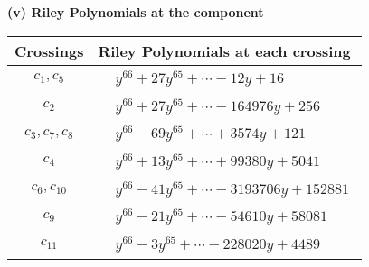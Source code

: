 \documentclass[1p]{elsarticle_modified}
\theoremstyle{definition}
\begin{document}
\flushleft \textbf{(v) Riley Polynomials at the component}\newline \\
\begin{tabular}{m{50pt}|m{274pt}}
Crossings & \hspace{64pt}Riley Polynomials at each crossing \\
\hline $$\begin{aligned}c_{1},c_{5}\end{aligned}$$&$\begin{aligned}
&y^{66}+27 y^{65}+\cdots-12 y+16
\end{aligned}$\\
\hline $$\begin{aligned}c_{2}\end{aligned}$$&$\begin{aligned}
&y^{66}+27 y^{65}+\cdots-164976 y+256
\end{aligned}$\\
\hline $$\begin{aligned}c_{3},c_{7},c_{8}\end{aligned}$$&$\begin{aligned}
&y^{66}-69 y^{65}+\cdots+3574 y+121
\end{aligned}$\\
\hline $$\begin{aligned}c_{4}\end{aligned}$$&$\begin{aligned}
&y^{66}+13 y^{65}+\cdots+99380 y+5041
\end{aligned}$\\
\hline $$\begin{aligned}c_{6},c_{10}\end{aligned}$$&$\begin{aligned}
&y^{66}-41 y^{65}+\cdots-3193706 y+152881
\end{aligned}$\\
\hline $$\begin{aligned}c_{9}\end{aligned}$$&$\begin{aligned}
&y^{66}-21 y^{65}+\cdots-54610 y+58081
\end{aligned}$\\
\hline $$\begin{aligned}c_{11}\end{aligned}$$&$\begin{aligned}
&y^{66}-3 y^{65}+\cdots-228020 y+4489
\end{aligned}$\\
\hline
\end{tabular}\\~\\
\end{document}
